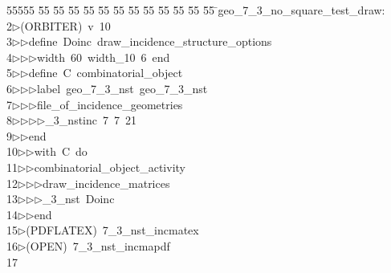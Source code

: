 %
%
\begin{tabbing}
55555 \= 55 \= 55 \= 55 \= 55 \= 55 \= 55 \= 55 \= 55 \= 55 \= 55 \= 55 \= 55 \= \>geo\_7\_3\_no\_square\_test\_draw:\\[0pt]
2\>$\triangleright$\>(ORBITER)\ v\ 10\ \\[0pt]
3\>$\triangleright$\>$\triangleright$\>define\ Doinc\ draw\_incidence\_structure\_options\ \\[0pt]
4\>$\triangleright$\>$\triangleright$\>$\triangleright$\>width\ 60\ width\_10\ 6\ end\ \\[0pt]
5\>$\triangleright$\>$\triangleright$\>define\ C\ combinatorial\_object\ \\[0pt]
6\>$\triangleright$\>$\triangleright$\>$\triangleright$\>label\ geo\_7\_3\_nst\ geo\_7\_3\_nst\ \\[0pt]
7\>$\triangleright$\>$\triangleright$\>$\triangleright$\>file\_of\_incidence\_geometries\ \\[0pt]
8\>$\triangleright$\>$\triangleright$\>$\triangleright$\>$\triangleright$\_3\_nstinc\ 7\ 7\ 21\ \\[0pt]
9\>$\triangleright$\>$\triangleright$\>end\ \\[0pt]
10\>$\triangleright$\>$\triangleright$\>with\ C\ do\ \\[0pt]
11\>$\triangleright$\>$\triangleright$\>combinatorial\_object\_activity\ \\[0pt]
12\>$\triangleright$\>$\triangleright$\>$\triangleright$\>draw\_incidence\_matrices\ \\[0pt]
13\>$\triangleright$\>$\triangleright$\>$\triangleright$\_3\_nst\ Doinc\ \\[0pt]
14\>$\triangleright$\>$\triangleright$\>end\\[0pt]
15\>$\triangleright$\>(PDFLATEX)\ 7\_3\_nst\_incmatex\\[0pt]
16\>$\triangleright$\>(OPEN)\ 7\_3\_nst\_incmapdf\\[0pt]
17\>\end{tabbing}
